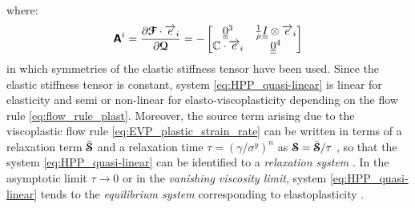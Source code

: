 where:
\begin{equation*}
  \boldsymbol{\mathsf{A}}^i=\frac{\partial {\boldsymbol{\mathcal{F}}}\cdot {\overrightarrow{e}}_i}{\partial {\boldsymbol{\mathcal{Q}}}}=-\left[\begin{matrix}{\underline{\underline{0}}}^3 & \frac{1}{\rho}{\underline{\underline{I}}}\otimes{\overrightarrow{e}}_i\\\mathbb{C}\cdot{\overrightarrow{e}}_i & {\underline{\underline{0}}}^4\end{matrix}\right]
\end{equation*}
in which symmetries of the elastic stiffness tensor have been used. Since the elastic stiffness tensor is constant, system \eqref{eq:HPP_quasi-linear} is linear for elasticity and semi or non-linear for elasto-viscoplasticity depending on the flow rule \eqref{eq:flow_rule_plast}. Moreover, the source term arising due to the viscoplastic flow rule \eqref{eq:EVP_plastic_strain_rate} can be written in terms of a relaxation term $\bar{{\boldsymbol{\mathcal{S}}}}$ and a relaxation time $\tau=(\gamma/\sigma^y)^n$ as ${\boldsymbol{\mathcal{S}}}=\bar{{\boldsymbol{\mathcal{S}}}}/\tau$ \cite{Thomas_EVP}, so that the system \eqref{eq:HPP_quasi-linear} can be identified to a \textit{relaxation system} \cite{Relaxation_syst}. In the asymptotic limit $\tau \rightarrow 0$ or in the \textit{vanishing viscosity limit}, system \eqref{eq:HPP_quasi-linear} tends to the \textit{equilibrium system} corresponding to elastoplasticity \cite{Thomas_EVP}.

